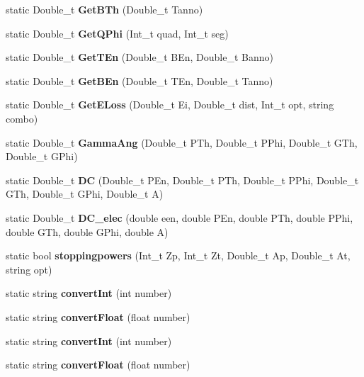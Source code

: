 \begin{DoxyCompactItemize}
static Double\+\_\+t {\bfseries Get\+B\+Th} (Double\+\_\+t Tanno)
\item 
\mbox{\label{classdoppler_ab8fcb952d529bbd30d147bf34f159c73}} 
static Double\+\_\+t {\bfseries Get\+Q\+Phi} (Int\+\_\+t quad, Int\+\_\+t seg)
\item 
\mbox{\label{classdoppler_aec7a929023626e54c17d4c83f2a6d2c3}} 
static Double\+\_\+t {\bfseries Get\+T\+En} (Double\+\_\+t B\+En, Double\+\_\+t Banno)
\item 
\mbox{\label{classdoppler_ad9a413e3272258f7ad88abeb2760bdbc}} 
static Double\+\_\+t {\bfseries Get\+B\+En} (Double\+\_\+t T\+En, Double\+\_\+t Tanno)
\item 
\mbox{\label{classdoppler_a154716ffad9dc13095b9accdd8197e04}} 
static Double\+\_\+t {\bfseries Get\+E\+Loss} (Double\+\_\+t Ei, Double\+\_\+t dist, Int\+\_\+t opt, string combo)
\item 
\mbox{\label{classdoppler_abdefc570d0519bd0e99f9a92d22707de}} 
static Double\+\_\+t {\bfseries Gamma\+Ang} (Double\+\_\+t P\+Th, Double\+\_\+t P\+Phi, Double\+\_\+t G\+Th, Double\+\_\+t G\+Phi)
\item 
\mbox{\label{classdoppler_a4eada56b71bec8f2218c6487431ed3f7}} 
static Double\+\_\+t {\bfseries DC} (Double\+\_\+t P\+En, Double\+\_\+t P\+Th, Double\+\_\+t P\+Phi, Double\+\_\+t G\+Th, Double\+\_\+t G\+Phi, Double\+\_\+t A)
\item 
\mbox{\label{classdoppler_a2d42bc47c077b472a9cbdd500d8092bc}} 
static Double\+\_\+t {\bfseries D\+C\+\_\+elec} (double een, double P\+En, double P\+Th, double P\+Phi, double G\+Th, double G\+Phi, double A)
\item 
\mbox{\label{classdoppler_add47e854c8b41d33ff6054c8daf0d163}} 
static bool {\bfseries stoppingpowers} (Int\+\_\+t Zp, Int\+\_\+t Zt, Double\+\_\+t Ap, Double\+\_\+t At, string opt)
\item 
\mbox{\label{classdoppler_a34a6c6112ce5e719a13a722353c8214f}} 
static string {\bfseries convert\+Int} (int number)
\item 
\mbox{\label{classdoppler_a3148106ce3d9d4861c505dab61ed7aae}} 
static string {\bfseries convert\+Float} (float number)
\item 
\mbox{\label{classdoppler_a34a6c6112ce5e719a13a722353c8214f}} 
static string {\bfseries convert\+Int} (int number)
\item 
\mbox{\label{classdoppler_a3148106ce3d9d4861c505dab61ed7aae}} 
static string {\bfseries convert\+Float} (float number)
\end{DoxyCompactItemize}


